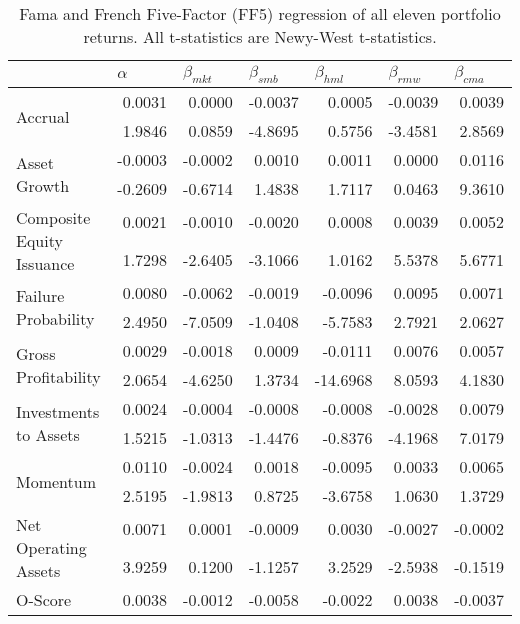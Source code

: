 \begin{table}[h]
    \scriptsize
    \caption{\newline Fama and French Five-Factor (FF5) regression of all eleven portfolio returns. All t-statistics are Newy-West t-statistics.}
    \label{tab:Table 4}
    \begin{tabular}{@{}lrrrrrr@{}}
    \toprule
     & \multicolumn{1}{l}{$\alpha$} & \multicolumn{1}{l}{$\beta_{mkt}$} & \multicolumn{1}{l}{$\beta_{smb}$} & \multicolumn{1}{l}{$\beta_{hml}$} & \multicolumn{1}{l}{$\beta_{rmw}$} & \multicolumn{1}{l}{$\beta_{cma}$} \\ \midrule
    \multirow{2}{*}{Accrual} & 0.0031 & 0.0000 & -0.0037 & 0.0005 & -0.0039 & 0.0039 \\
     & 1.9846 & 0.0859 & -4.8695 & 0.5756 & -3.4581 & 2.8569 \\
    \multirow{2}{*}{Asset Growth} & -0.0003 & -0.0002 & 0.0010 & 0.0011 & 0.0000 & 0.0116 \\
     & -0.2609 & -0.6714 & 1.4838 & 1.7117 & 0.0463 & 9.3610 \\
    \multirow{2}{*}{Composite Equity Issuance} & 0.0021 & -0.0010 & -0.0020 & 0.0008 & 0.0039 & 0.0052 \\
     & 1.7298 & -2.6405 & -3.1066 & 1.0162 & 5.5378 & 5.6771 \\
    \multirow{2}{*}{Failure Probability} & 0.0080 & -0.0062 & -0.0019 & -0.0096 & 0.0095 & 0.0071 \\
     & 2.4950 & -7.0509 & -1.0408 & -5.7583 & 2.7921 & 2.0627 \\
    \multirow{2}{*}{Gross Profitability} & 0.0029 & -0.0018 & 0.0009 & -0.0111 & 0.0076 & 0.0057 \\
     & 2.0654 & -4.6250 & 1.3734 & -14.6968 & 8.0593 & 4.1830 \\
    \multirow{2}{*}{Investments to Assets} & 0.0024 & -0.0004 & -0.0008 & -0.0008 & -0.0028 & 0.0079 \\
     & 1.5215 & -1.0313 & -1.4476 & -0.8376 & -4.1968 & 7.0179 \\
    \multirow{2}{*}{Momentum} & 0.0110 & -0.0024 & 0.0018 & -0.0095 & 0.0033 & 0.0065 \\
     & 2.5195 & -1.9813 & 0.8725 & -3.6758 & 1.0630 & 1.3729 \\
    \multirow{2}{*}{Net Operating Assets} & 0.0071 & 0.0001 & -0.0009 & 0.0030 & -0.0027 & -0.0002 \\
     & 3.9259 & 0.1200 & -1.1257 & 3.2529 & -2.5938 & -0.1519 \\
    \multirow{2}{*}{O-Score} & 0.0038 & -0.0012 & -0.0058 & -0.0022 & 0.0038 & -0.0037 \\

\end{tabular}
\end{table}

